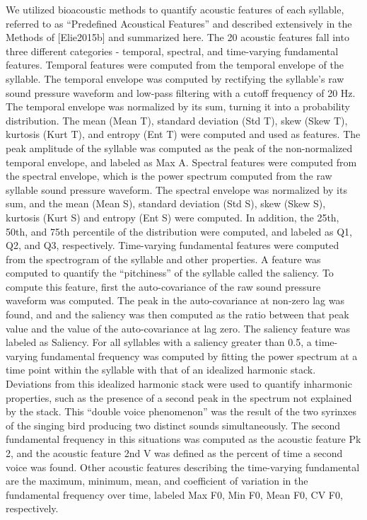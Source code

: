     We utilized bioacoustic methods to quantify acoustic features of each syllable, referred to as “Predefined Acoustical Features” and described extensively in the Methods of [Elie2015b] and summarized here. The 20 acoustic features fall into three different categories - temporal, spectral, and time-varying fundamental features.
    Temporal features were computed from the temporal envelope of the syllable. The temporal envelope was computed by rectifying the syllable’s raw sound pressure waveform and low-pass filtering with a cutoff frequency of 20 Hz. The temporal envelope was normalized by its sum, turning it into a probability distribution. The mean (Mean T), standard deviation (Std T), skew (Skew T), kurtosis (Kurt T), and entropy (Ent T) were computed and used as features. The peak amplitude of the syllable was computed as the peak of the non-normalized temporal envelope, and labeled as Max A.
Spectral features were computed from the spectral envelope, which is the power spectrum computed from the raw syllable sound pressure waveform. The spectral envelope was normalized by its sum, and the mean (Mean S), standard deviation (Std S), skew (Skew S), kurtosis (Kurt S) and entropy (Ent S) were computed. In addition, the 25th, 50th, and 75th percentile of the distribution were computed, and labeled as Q1, Q2, and Q3, respectively.
Time-varying fundamental features were computed from the spectrogram of the syllable and other properties. A feature was computed to quantify the “pitchiness” of the syllable called the saliency. To compute this feature, first the auto-covariance of the raw sound pressure waveform was computed. The peak in the auto-covariance at non-zero lag was found, and and the saliency was then computed as the ratio between that peak value and the value of the auto-covariance at lag zero. The saliency feature was labeled as Saliency.
    For all syllables with a saliency greater than 0.5, a time-varying fundamental frequency was computed by fitting the power spectrum at a time point within the syllable with that of an idealized harmonic stack. Deviations from this idealized harmonic stack were used to quantify inharmonic properties, such as the presence of a second peak in the spectrum not explained by the stack. This “double voice phenomenon” was the result of the two syrinxes of the singing bird producing two distinct sounds simultaneously. The second fundamental frequency in this situations was computed as the acoustic feature Pk 2, and the acoustic feature 2nd V was defined as the percent of time a second voice was found. Other acoustic features describing the time-varying fundamental are the maximum, minimum, mean, and coefficient of variation in the fundamental frequency over time, labeled Max F0, Min F0, Mean F0, CV F0, respectively.

